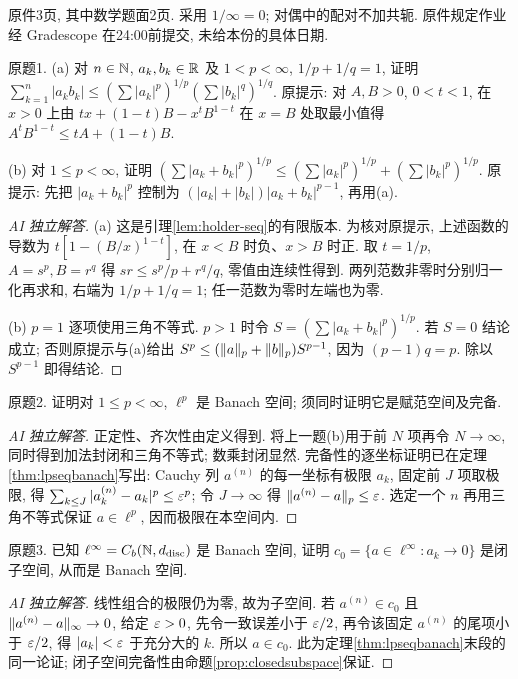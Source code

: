 \label{sec:ps01}
原件3页, 其中数学题面2页. 采用 $1/\infty=0$; 对偶中的配对不加共轭. 原件规定作业经 Gradescope 在24:00前提交, 未给本份的具体日期.
\begin{exercise}\label{ps01:1}
原题1. (a) 对 $n\in\mathbb N$, $a_k,b_k\in\mathbb R$ 及 $1<p<\infty$, $1/p+1/q=1$, 证明 $\sum_{k=1}^n|a_kb_k|\le(\sum|a_k|^p)^{1/p}(\sum|b_k|^q)^{1/q}$. 原提示: 对 $A,B>0$, $0<t<1$, 在 $x>0$ 上由 $t x+(1-t)B-x^tB^{1-t}$ 在 $x=B$ 处取最小值得 $A^tB^{1-t}\le tA+(1-t)B$.

(b) 对 $1\le p<\infty$, 证明 $(\sum|a_k+b_k|^p)^{1/p}\le(\sum|a_k|^p)^{1/p}+(\sum|b_k|^p)^{1/p}$. 原提示: 先把 $|a_k+b_k|^p$ 控制为 $(|a_k|+|b_k|)|a_k+b_k|^{p-1}$, 再用(a).
\end{exercise}
\begin{proof}[AI 独立解答]
(a) 这是引理\ref{lem:holder-seq}的有限版本. 为核对原提示, 上述函数的导数为 $t[1-(B/x)^{1-t}]$, 在 $x<B$ 时负、$x>B$ 时正. 取 $t=1/p$, $A=s^p,B=r^q$ 得 $sr\le s^p/p+r^q/q$, 零值由连续性得到. 两列范数非零时分别归一化再求和, 右端为 $1/p+1/q=1$; 任一范数为零时左端也为零.

(b) $p=1$ 逐项使用三角不等式. $p>1$ 时令 $S=(\sum|a_k+b_k|^p)^{1/p}$. 若 $S=0$ 结论成立; 否则原提示与(a)给出 $S^p\le(\lVert a\rVert_p+\lVert b\rVert_p)S^{p-1}$, 因为 $(p-1)q=p$. 除以 $S^{p-1}$ 即得结论.
\end{proof}
\begin{exercise}\label{ps01:2}
原题2. 证明对 $1\le p<\infty$, $\ell^p$ 是 Banach 空间; 须同时证明它是赋范空间及完备.
\end{exercise}
\begin{proof}[AI 独立解答]
正定性、齐次性由定义得到. 将上一题(b)用于前 $N$ 项再令 $N\to\infty$, 同时得到加法封闭和三角不等式; 数乘封闭显然. 完备性的逐坐标证明已在定理\ref{thm:lpseqbanach}写出: Cauchy 列 $a^{(n)}$ 的每一坐标有极限 $a_k$, 固定前 $J$ 项取极限, 得 $\sum_{k\le J}|a_k^{(n)}-a_k|^p\le\varepsilon^p$; 令 $J\to\infty$ 得 $\lVert a^{(n)}-a\rVert_p\le\varepsilon$. 选定一个 $n$ 再用三角不等式保证 $a\in\ell^p$, 因而极限在本空间内.
\end{proof}
\begin{exercise}\label{ps01:3}
原题3. 已知 $\ell^\infty=C_b(\mathbb N,d_{\rm disc})$ 是 Banach 空间, 证明 $c_0=\{a\in\ell^\infty:a_k\to0\}$ 是闭子空间, 从而是 Banach 空间.
\end{exercise}
\begin{proof}[AI 独立解答]
线性组合的极限仍为零, 故为子空间. 若 $a^{(n)}\in c_0$ 且 $\lVert a^{(n)}-a\rVert_\infty\to0$, 给定 $\varepsilon>0$, 先令一致误差小于 $\varepsilon/2$, 再令该固定 $a^{(n)}$ 的尾项小于 $\varepsilon/2$, 得 $|a_k|<\varepsilon$ 于充分大的 $k$. 所以 $a\in c_0$. 此为定理\ref{thm:lpseqbanach}末段的同一论证; 闭子空间完备性由命题\ref{prop:closedsubspace}保证.
\end{proof}
